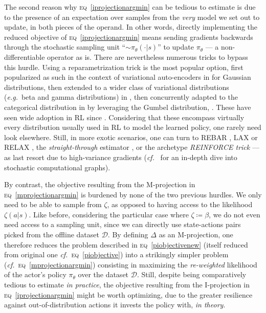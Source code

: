 The second reason why \textsc{eq}~\ref{iprojectionargmin} can be tedious to estimate is due to the presence of
an expectation over samples from the \textit{very} model we set out to update,
in both pieces of the operand.
In other words, directly implementing the reduced objective of
\textsc{eq}~\ref{iprojectionargmin} means sending gradients backwards through the stochastic sampling unit
``$\sim \pi_\theta(\cdot |s)$'' to update $\pi_\theta$ --- a non-differentiable operator as is.
There are nevertheless numerous tricks to bypass this hurdle.
Using a reparametrization trick is the most popular option, first popularized as such in the context of
variational auto-encoders in \cite{Kingma2014-hf, Rezende2014-ef} for Gaussian distributions,
then extended to a wider class of variational distributions (\textit{e.g.}~beta and gamma distributions)
in \cite{Ruiz2016-qe},
then concurrently adapted to the categorical distribution in \cite{Jang2017-tu, Maddison2017-gk}
by leveraging the Gumbel distribution, \cite{Gumbel1954-xu}.
These have seen wide adoption in RL since \cite{Heess2015-va}.
Considering that these encompass virtually every distribution usually used in RL to model the learned policy,
one rarely need look elsewhere. Still, in more exotic scenarios, one can turn to
REBAR \cite{Tucker2017-zj},
LAX or RELAX \cite{Grathwohl2018-dw},
the \textit{straight-through} estimator \cite{Bengio2013-hg},
or the archetype \textit{REINFORCE trick} \cite{Williams1992-xn}
--- as last resort due to high-variance gradients
(\textit{cf.}~\cite{Schulman2015-br, Schulman2016-wc}
for an in-depth dive into stochastic computational graphs).

By contrast, the objective resulting from the M-projection in \textsc{eq}~\ref{mprojectionargmin}
is burdened by none of the two previous hurdles. We only need to be able to sample from $\zeta$,
as opposed to having access to the likelihood $\zeta(a | s)$.
Like before, considering the particular case where $\zeta \coloneqq \beta$,
we do not even need access to a sampling unit, since we can directly use state-actions pairs picked from the
offline dataset $\mathcal{D}$. By defining $\Delta$ as an M-projection, one therefore reduces the
problem described in \textsc{eq}~\ref{piobjectivenew} (itself reduced from original one
\textit{cf.}~\textsc{eq}~\ref{piobjective}) into a strikingly simpler
problem (\textit{cf.}~\textsc{eq}~\ref{mprojectionargmin})
consisting in maximizing the \emph{re-weighted} likelihood of the actor's policy $\pi_\theta$
over the dataset $\mathcal{D}$.
Still, despite being comparatively tedious to estimate \emph{in practice},
the objective resulting from the I-projection in \textsc{eq}~\ref{iprojectionargmin} might be worth optimizing,
due to the greater resilience against out-of-distribution actions it invests the policy with, \textit{in theory}.

